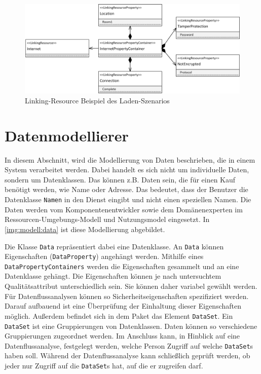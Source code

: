 \begin{figure}[h]
	\centering
  	\includegraphics[width=1\textwidth]{images/szenario_lr.png}
	\caption{Linking-Resource Beispiel des Laden-Szenarios}
	\label{img:szenario:lr}
\end{figure}

\section{Datenmodellierer}
\label{sec:data}
In diesem Abschnitt, wird die Modellierung von Daten beschrieben, die in einem System verarbeitet werden. Dabei handelt es sich nicht um individuelle Daten, sondern um Datenklassen. Das können z.B. Daten sein, die für einen Kauf benötigt werden, wie Name oder Adresse. Das bedeutet, dass der Benutzer die Datenklasse \texttt{Namen} in den Dienst eingibt und nicht einen speziellen Namen. Die Daten werden vom Komponentenentwickler sowie dem Domänenexperten im Ressourcen-Umgebungs-Modell und Nutzungsmodel eingesetzt. In \autoref{img:modell:data} ist diese Modellierung abgebildet. \par
Die Klasse \texttt{Data} repräsentiert dabei eine Datenklasse. An \texttt{Data} können Eigenschaften (\texttt{DataProperty}) angehängt werden. Mithilfe eines \texttt{DataPropertyContainers} werden die Eigenschaften gesammelt und an eine Datenklasse gehängt. Die Eigenschaften können je nach untersuchtem Qualitätsattribut unterschiedlich sein. Sie können daher variabel gewählt werden. Für Datenflussanalysen können so Sicherheitseigenschaften spezifiziert werden. Darauf aufbauend ist eine Überprüfung der Einhaltung dieser Eigenschaften möglich. Außerdem befindet sich in dem Paket das Element \texttt{DataSet}. Ein \texttt{DataSet} ist eine Gruppierungen von Datenklassen. Daten können so verschiedene Gruppierungen zugeordnet werden. Im Anschluss kann, in Hinblick auf eine Datenflussanalyse, festgelegt werden, welche Person Zugriff auf welche \texttt{DataSet}s haben soll. Während der Datenflussanalyse kann schließlich geprüft werden, ob jeder nur Zugriff auf die \texttt{DataSet}s hat, auf die er zugreifen darf. \par
